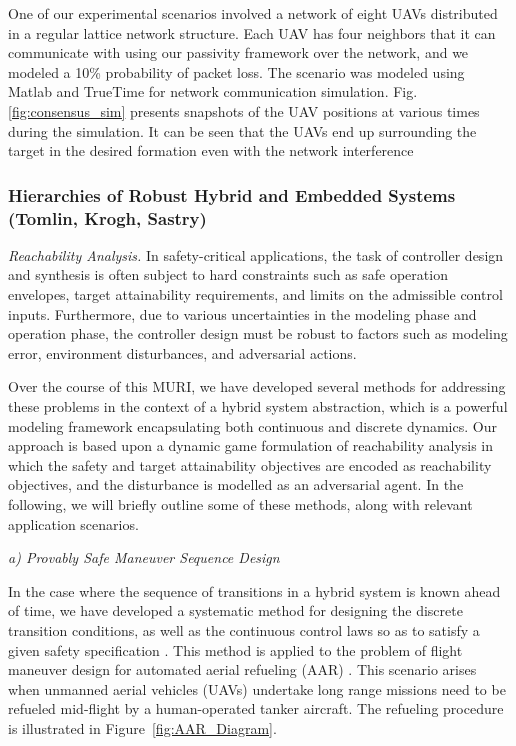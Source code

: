 One of our experimental scenarios involved a network of eight UAVs distributed in a regular lattice network structure.  Each UAV has four neighbors that it can communicate with using our passivity framework over the network, and we modeled a 10\% probability of packet loss. The scenario was modeled using Matlab and TrueTime for network communication simulation.  Fig. \ref{fig:consensus_sim} presents snapshots of the UAV positions at various times during the simulation.  It can be seen that the UAVs end up surrounding the target in the desired formation even with the network interference

            \subsubsection{Hierarchies of Robust Hybrid and Embedded Systems (Tomlin, Krogh, Sastry)} 
               
               \textit{Reachability Analysis.}  In safety-critical
               applications, the task of controller design and
               synthesis is often subject to hard constraints such as
               safe operation envelopes, target attainability
               requirements, and limits on the admissible control
               inputs.  Furthermore, due to various uncertainties in
               the modeling phase and operation phase, the controller
               design must be robust to factors such as modeling
               error, environment disturbances, and adversarial
               actions.

               Over the course of this MURI, we have developed several
               methods for addressing these problems in the context of
               a hybrid system abstraction, which is a powerful
               modeling framework encapsulating both continuous and
               discrete dynamics.  Our approach is based upon a
               dynamic game formulation of reachability analysis in
               which the safety and target attainability objectives
               are encoded as reachability objectives, and the
               disturbance is modelled as an adversarial agent.  In
               the following, we will briefly outline some of these
               methods, along with relevant application scenarios.

               \emph{a) Provably Safe Maneuver Sequence Design}

               In the case where the sequence of transitions in a
               hybrid system is known ahead of time, we have developed
               a systematic method for designing the discrete
               transition conditions, as well as the continuous
               control laws so as to satisfy a given safety
               specification
               \cite{c:ding-CDC-2008,j:ding-aiaa-gnd-2011}.  This
               method is applied to the problem of flight maneuver
               design for automated aerial refueling (AAR) .  This
               scenario arises when unmanned aerial vehicles (UAVs)
               undertake long range missions need to be refueled
               mid-flight by a human-operated tanker aircraft.  The
               refueling procedure is illustrated in
               Figure~\ref{fig:AAR_Diagram}.

